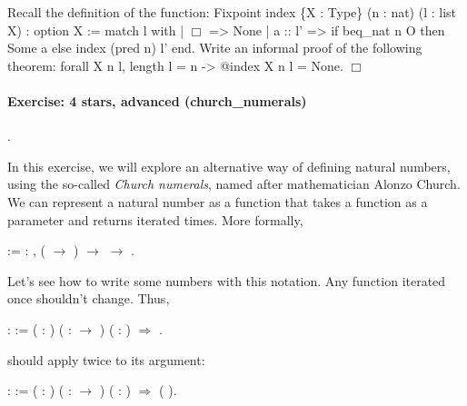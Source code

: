 \documentclass[12pt]{report}
\begin{document}
 Recall the definition of the  function:
   Fixpoint index \{X : Type\} (n : nat) (l : list X) : option X :=
     match l with
     | \ensuremath{\Box} => None 
     | a :: l' => if beq\_nat n O then Some a else index (pred n) l'
     end.
   Write an informal proof of the following theorem:
   forall X n l, length l = n -> @index X n l = None.
 \ensuremath{\Box} 

\paragraph{Exercise: 4 stars, advanced (church\_numerals)}

\begin{coqdoccode}
\coqdocemptyline
\coqdocnoindent
{} .\coqdoceol
\coqdocemptyline
\end{coqdoccode}
In this exercise, we will explore an alternative way of defining
    natural numbers, using the so-called \textit{Church numerals}, named
    after mathematician Alonzo Church. We can represent a natural
    number  as a function that takes a function  as a parameter
    and returns  iterated  times. More formally, \begin{coqdoccode}
\coqdocemptyline
\coqdocnoindent
{}  := \coqdockw{\ensuremath{\forall}}  : , ( \ensuremath{\rightarrow} ) \ensuremath{\rightarrow}  \ensuremath{\rightarrow} .\coqdoceol
\coqdocemptyline
\end{coqdoccode}
Let's see how to write some numbers with this notation. Any
    function  iterated once shouldn't change. Thus, \begin{coqdoccode}
\coqdocemptyline
\coqdocnoindent
{}  :  := \coqdoceol
\coqdocindent{1.00em}
 ( : ) ( :  \ensuremath{\rightarrow} ) ( : ) \ensuremath{\Rightarrow}  .\coqdoceol
\coqdocemptyline
\end{coqdoccode}
 should apply  twice to its argument: \begin{coqdoccode}
\coqdocemptyline
\coqdocnoindent
{}  :  :=\coqdoceol
\coqdocindent{1.00em}
 ( : ) ( :  \ensuremath{\rightarrow} ) ( : ) \ensuremath{\Rightarrow}  ( ).\coqdoceol
\coqdocemptyline
\end{coqdoccode}
\end{document}

